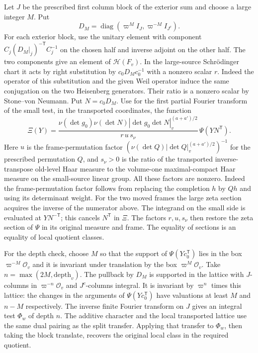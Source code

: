 Let \(J\) be the prescribed first column block of the exterior
sum and choose a large integer \(M\).
Put
\[
 D_M=\operatorname{diag}(\varpi^M I_J,\varpi^{-M}I_{J^c}).
\]
For each exterior block, use the unitary element with
component \(C_j(D_M|_j)^{-\mathsf T}C_j^{-1}\) on the
chosen half and inverse adjoint on the other half.
The two components give an element of \(\mathcal H(F_v)\).
In the large-source Schr\"odinger chart it acts by right
substitution by \(c_0 D_M c_0^{-1}\) with a nonzero scalar
\(r\). Indeed the operator of this substitution and the
given Weil operator induce the same conjugation on the
two Heisenberg generators. Their ratio is a nonzero
scalar by Stone--von Neumann. Put \(N=c_0D_M\).
Use for the first partial Fourier transform of the small
test, in the transported coordinates, the function
\[
 \Xi(Y)=
 \frac{\nu(\det g_0)\nu(\det N)
             |\det g_0\det N|_v^{(a+a')/2}}
      {r\,u\,s_\nu}\,\Psi(YN^{\mathsf T}).
\]
Here \(u\) is the frame-permutation factor
\((\nu(\det Q)|\det Q|_v^{(a+a')/2})^{-1}\) for the
prescribed permutation \(Q\), and \(s_\nu>0\) is the ratio
of the transported inverse-transpose old-level Haar
measure to the volume-one maximal-compact Haar measure
on the small-source linear group. All these factors
are nonzero. Indeed the frame-permutation factor follows
from replacing the completion \(h\) by \(Qh\) and using its
determinant weight. For the two moved frames the large
zeta section acquires the inverse of the numerator above.
The integrand on the small side is evaluated at
\(Y N^{-\mathsf T}\); this cancels \(N^{\mathsf T}\) in
\(\Xi\). The factors \(r,u,s_\nu\) then restore the
zeta section of \(\Psi\) in its original measure and
frame. The equality of sections is an equality of
local quotient classes.

For the depth check, choose \(M\) so that the support of
\(\Psi(Yc_0^{\mathsf T})\) lies in the box
\(\varpi^{-M}\mathcal O_v\) and it is invariant under
translation by the box \(\varpi^M\mathcal O_v\).
Take \(n=\max(2M,\mathrm{depth}_v)\).
The pullback by \(D_M\) is supported in the lattice
with \(J\)-columns in \(\varpi^{-n}\mathcal O_v\) and
\(J^c\)-columns integral. It is invariant by
\(\varpi^n\) times this lattice: the changes in the
arguments of \(\Psi(Yc_0^{\mathsf T})\) have valuations at
least \(M\) and \(n-M\) respectively. The inverse finite
Fourier transform on \(J\) gives an integral test
\(\Phi_w\) of depth \(n\). The additive character and
the local transported lattice use the same dual pairing
as the split transfer. Applying that transfer to
\(\Phi_w\), then taking the block translate, recovers
the original local class in the required quotient.

